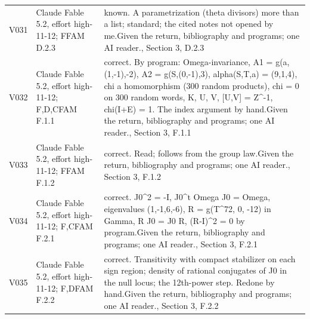 \begin{longtable}{@{}L{.08\linewidth}L{.31\linewidth}L{.56\linewidth}@{}}
V031 & Claude Fable 5.2, effort high-11-12; F\newline FAM D.2.3 & known. A parametrization (theta divisors) more than a list; standard; the cited notes not opened by me.\newline Given the return, bibliography and programs; one AI reader.\newline {}, Section 3, D.2.3\\
V032 & Claude Fable 5.2, effort high-11-12; F,D,C\newline FAM F.1.1 & correct. By program:\allowbreak{} Omega-invariance, A1 = g(a,(1,-1),-2), A2 = g(S,(0,-1),3), alpha(S,T,a) = (9,1,4), chi a homomorphism (300 random products), chi = 0 on 300 random words, K, U, V, [U,V] = Z\textasciicircum{}-1, chi(I+E) = 1. The index argument by hand.\newline Given the return, bibliography and programs; one AI reader.\newline {}, Section 3, F.1.1\\
V033 & Claude Fable 5.2, effort high-11-12; F\newline FAM F.1.2 & correct. Read; follows from the group law.\newline Given the return, bibliography and programs; one AI reader.\newline {}, Section 3, F.1.2\\
V034 & Claude Fable 5.2, effort high-11-12; F,C\newline FAM F.2.1 & correct. J0\textasciicircum{}2 = -I, J0\textasciicircum{}t Omega J0 = Omega, eigenvalues (1,-1,6,-6), R = g(T\textasciicircum{}72, 0, -12) in Gamma, R J0 = J0 R, (R-I)\textasciicircum{}2 = 0 by program.\newline Given the return, bibliography and programs; one AI reader.\newline {}, Section 3, F.2.1\\
V035 & Claude Fable 5.2, effort high-11-12; F,D\newline FAM F.2.2 & correct. Transitivity with compact stabilizer on each sign region; density of rational conjugates of J0 in the null locus; the 12th-power step. Redone by hand.\newline Given the return, bibliography and programs; one AI reader.\newline {}, Section 3, F.2.2\\

\end{longtable}
